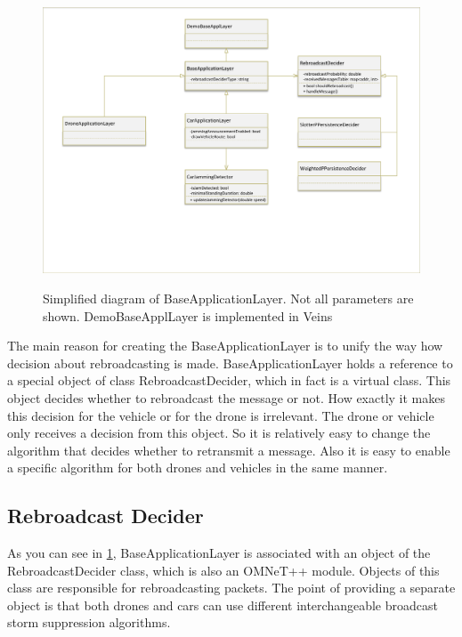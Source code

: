 \documentclass[]{nsm-thesis}
\begin{document}
\begin{figure}
  	\caption{Simplified diagram of BaseApplicationLayer. Not all parameters are shown. DemoBaseApplLayer is implemented in Veins \cite{demobaseappllayer}}
	\centering
	\includegraphics[width=1\textwidth]{figures/BaseApplicationLayer.pdf}
	\label{fig:baseapplicationlayer}
\end{figure}

The main reason for creating the BaseApplicationLayer is to unify the way how decision about rebroadcasting is made. BaseApplicationLayer holds a reference to a special object of class RebroadcastDecider, which in fact is a virtual class. This object decides whether to rebroadcast the message or not. How exactly it makes this decision for the vehicle or for the drone is irrelevant. The drone or vehicle only receives a decision from this object. So it is relatively easy to change the algorithm that decides whether to retransmit a message. Also it is easy to enable a specific algorithm for both drones and vehicles in the same manner.

\subsection {Rebroadcast Decider}

As you can see in \cref{fig:baseapplicationlayer}, BaseApplicationLayer is associated with an object of the RebroadcastDecider class, which is also an OMNeT++ module. Objects of this class are responsible for rebroadcasting packets. The point of providing a separate object is that both drones and cars can use different interchangeable broadcast storm suppression algorithms. 
\end{document}
